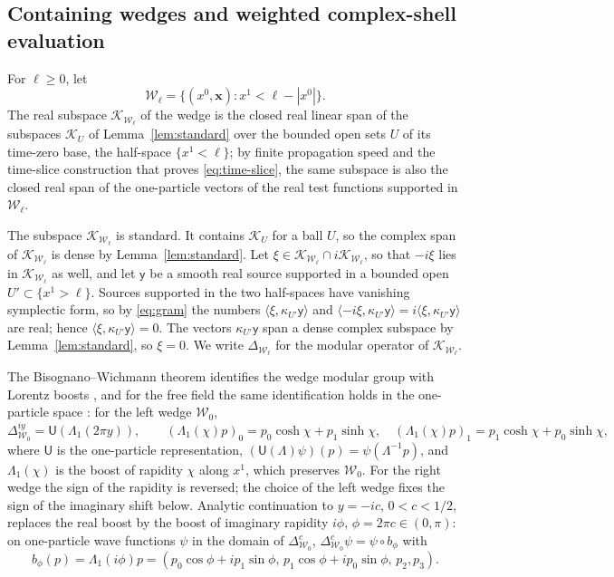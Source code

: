 \documentclass[11pt]{amsart}
\numberwithin{equation}{section}
\theoremstyle{definition}
\newcommand{\sy}{\mathsf y}
\newcommand{\bx}{\mathbf x}
\newcommand{\ip}[2]{\langle #1,#2\rangle}
\begin{document}
\subsection{Containing wedges and weighted complex-shell evaluation}

For \(\ell\ge0\), let
\[
 \mathcal W_\ell
 =\{(x^0,\bx):x^1<\ell-|x^0|\}.
\]
The real subspace \(\mathcal K_{\mathcal W_\ell}\) of the wedge is the
closed real linear span of the subspaces \(\mathcal K_U\) of
Lemma~\ref{lem:standard} over the bounded open sets \(U\) of its time-zero
base, the half-space \(\{x^1<\ell\}\); by finite propagation speed and the
time-slice construction that proves \eqref{eq:time-slice}, the same subspace is also the
closed real span of the one-particle vectors of the real test functions
supported in \(\mathcal W_\ell\).

The subspace \(\mathcal K_{\mathcal W_\ell}\)
is standard. It contains \(\mathcal K_U\) for a ball \(U\), so the complex
span of \(\mathcal K_{\mathcal W_\ell}\) is dense by Lemma~\ref{lem:standard}. Let
\(\xi\in\mathcal K_{\mathcal W_\ell}\cap i\mathcal K_{\mathcal W_\ell}\), so
that \(-i\xi\) lies in \(\mathcal K_{\mathcal W_\ell}\) as well, and let
\(\sy\) be a smooth real source supported in a bounded open
\(U'\subset\{x^1>\ell\}\). Sources supported in the two half-spaces have
vanishing symplectic form, so by \eqref{eq:gram} the numbers
\(\ip{\xi}{\kappa_{U'}\sy}\) and
\(\ip{-i\xi}{\kappa_{U'}\sy}=i\ip{\xi}{\kappa_{U'}\sy}\) are real; hence
\(\ip{\xi}{\kappa_{U'}\sy}=0\). The vectors \(\kappa_{U'}\sy\) span a dense
complex subspace by Lemma~\ref{lem:standard}, so \(\xi=0\). We write
\(\Delta_{\mathcal W_\ell}\) for the modular operator of
\(\mathcal K_{\mathcal W_\ell}\).

The Bisognano--Wichmann theorem identifies the wedge modular group with
Lorentz boosts \cite{BW75}, and for the free field the same
identification holds in the one-particle space
\cite[Remark~3.6(2)]{BGL02}: for the left wedge \(\mathcal W_0\),
\[
 \Delta_{\mathcal W_0}^{iy}=\mathsf U(\Lambda_1(2\pi y)),\qquad
 (\Lambda_1(\chi)p)_0=p_0\cosh\chi+p_1\sinh\chi,\quad
 (\Lambda_1(\chi)p)_1=p_1\cosh\chi+p_0\sinh\chi,
\]
where \(\mathsf U\) is the one-particle representation,
\((\mathsf U(\Lambda)\psi)(p)=\psi(\Lambda^{-1}p)\), and \(\Lambda_1(\chi)\)
is the boost of rapidity \(\chi\) along \(x^1\), which preserves
\(\mathcal W_0\). For the right wedge the sign of the rapidity is
reversed; the choice of the left wedge fixes the sign of the imaginary
shift below. Analytic continuation to \(y=-ic\), \(0<c<1/2\),
replaces the real boost by the boost of imaginary rapidity \(i\phi\),
\(\phi=2\pi c\in(0,\pi)\): on one-particle wave functions \(\psi\) in the
domain of \(\Delta_{\mathcal W_0}^{c}\),
\(\Delta_{\mathcal W_0}^{c}\psi=\psi\circ b_\phi\) with
\[
 b_\phi(p)=\Lambda_1(i\phi)p=
 (p_0\cos\phi+ip_1\sin\phi,\,
  p_1\cos\phi+ip_0\sin\phi,\,
  p_2,p_3).
\]
\end{document}
